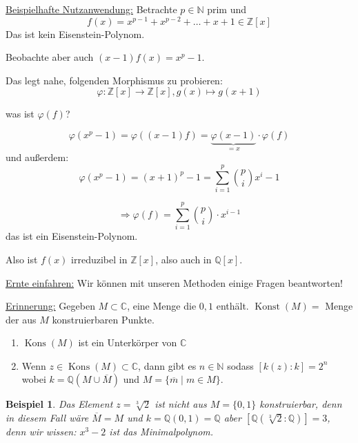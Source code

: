 \documentclass[a4paper,12pt,numbers=noenddot,parskip=full]{scrartcl}
\newcommand{\setN}{\mathbb{N}}
\newcommand{\setZ}{\mathbb{Z}}
\newcommand{\setQ}{\mathbb{Q}}
\newcommand{\setC}{\mathbb{C}}
\newcommand{\heading}{\underline}
\theoremstyle{dotless}
\newtheorem{example}[theorem]{Beispiel}
\theoremstyle{remark}
\begin{document}
	\heading{Beispielhafte Nutzanwendung:} Betrachte $p \in \setN$ prim und
	\begin{equation*}
		f(x) = x^{p-1} + x^{p-2} + \dots + x + 1 \in \setZ[x]
	\end{equation*}
	Das ist kein Eisenstein-Polynom.
	
	Beobachte aber auch $(x-1)f(x) = x^p -1$.
	
	Das legt nahe, folgenden Morphismus zu probieren:
	\begin{equation*}
		\varphi: \setZ[x] \to \setZ[x], g(x) \mapsto g(x + 1)
	\end{equation*}
	
	was ist $\varphi(f)$?
	
	\begin{equation*}
		\varphi(x^p - 1) = \varphi((x-1)f) = \underbrace{\varphi(x-1)}_{=x} \cdot \varphi(f)
	\end{equation*}
	und außerdem:
	\begin{equation*}
		\varphi(x^p - 1) = (x+1)^p - 1 = \sum_{i=1}^{p} \binom{p}{i} x^i - 1
	\end{equation*}
	
	\begin{equation*}
		\Rightarrow \varphi(f) = \sum_{i = 1}^p \binom{p}{i} \cdot x^{i-1}
	\end{equation*}
	das ist ein Eisenstein-Polynom.
	
	Also ist $f(x)$ irreduzibel in $\setZ[x]$, also auch in $\setQ[x]$.
	
	\heading{Ernte einfahren:} Wir können mit unseren Methoden einige Fragen beantworten!
	
	\heading{Erinnerung:} Gegeben $M \subset \setC$, eine Menge die $0,1$ enthält. $\operatorname{Konst}(M) =$ Menge der aus $M$ konstruierbaren Punkte.
	
	\begin{enumerate}
		\item $\operatorname{Kons}(M)$ ist ein Unterkörper von $\setC$
		\item Wenn $z \in \operatorname{Kons}(M) \subset \setC$, dann gibt es $n \in \setN$ sodass $[k(z): k] = 2^n$ wobei $k = \setQ(M \cup \overline{M})$ und $M = \{ \overline{m} \mid m \in M \}$.
	\end{enumerate}
	
	\begin{example}
		Das Element $z = \sqrt[3]{2}$ ist nicht aus $M = \{ 0, 1 \}$ konstruierbar, denn in diesem Fall wäre $\overline{M} = M$ und $k = \setQ(0,1) = \setQ$ aber $[\setQ(\sqrt[3]{2}: \setQ)] = 3$, denn wir wissen: $x^3 - 2$ ist das Minimalpolynom.
	\end{example}
\end{document}
